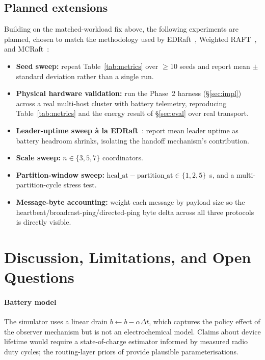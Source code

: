 \documentclass[conference]{IEEEtran}
\begin{document}
\subsection{Planned extensions}
Building on the matched-workload fix above, the following experiments
are planned, chosen to match the methodology used by
EDRaft~\cite{barros2023edraft}, Weighted RAFT~\cite{xu2021weighted},
and MCRaft~\cite{xu2022mcraft}:
\begin{itemize}
\item \textbf{Seed sweep:} repeat Table~\ref{tab:metrics} over
  $\geq$10 seeds and report mean $\pm$ standard deviation rather than a
  single run.
\item \textbf{Physical hardware validation:} run the Phase~2 harness
  (\S\ref{sec:impl}) across a real multi-host cluster with battery
  telemetry, reproducing Table~\ref{tab:metrics} and the energy result
  of \S\ref{sec:eval} over real transport.
\item \textbf{Leader-uptime sweep à la EDRaft}~\cite{barros2023edraft}:
  report mean leader uptime as battery headroom shrinks, isolating the
  handoff mechanism's contribution.
\item \textbf{Scale sweep:} $n \in \{3,5,7\}$ coordinators.
\item \textbf{Partition-window sweep:}
  $\text{heal\_at}{-}\text{partition\_at}\in\{1,2,5\}$~s, and a
  multi-partition-cycle stress test.
\item \textbf{Message-byte accounting:} weight each message by payload
  size so the heartbeat/broadcast-ping/directed-ping byte delta across
  all three protocols is directly visible.
\end{itemize}

\section{Discussion, Limitations, and Open Questions}\label{sec:discussion}

\paragraph{Battery model}
The simulator uses a linear drain $b \leftarrow b - \alpha\Delta t$,
which captures the policy effect of the observer mechanism but is not
an electrochemical model. Claims about device lifetime would require a
state-of-charge estimator informed by measured radio duty cycles; the
routing-layer priors of \cite{shah2018energy,samadi2023intelligent,
kang2024uav} provide plausible parameterisations.
\end{document}
